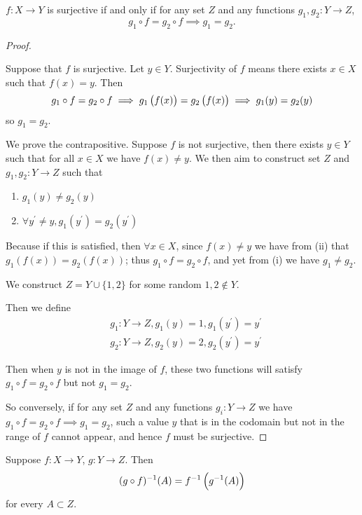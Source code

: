 \begin{proposition}
$f:X\to Y$ is surjective if and only if for any set $Z$ and any functions $g_1,g_2:Y\to Z$,
\[g_1 \circ f=g_2 \circ f \implies g_1=g_2.\]
\end{proposition}

\begin{proof} \

\fbox{$\implies$} Suppose that $f$ is surjective. Let $y\in Y$. Surjectivity of $f$ means there exists $x\in X$ such that $f(x)=y$. Then
\[g_1\circ f=g_2 \circ f\implies g_1\left(f(x)\right)=g_2\left(f(x)\right)\implies g_1(y)=g_2(y) \]
so $g_1=g_2$.

\fbox{$\impliedby$} We prove the contrapositive. Suppose $f$ is not surjective, then there exists $y \in Y$ such that for all $x \in X$ we have $f(x)\neq y$. We then aim to construct set $Z$ and $g_1,g_2:Y\to Z$ such that
\begin{enumerate}[label=(\roman*)]
\item $g_1(y) \neq g_2(y)$
\item $\forall y^\prime \neq y, g_1(y^\prime)=g_2(y^\prime)$
\end{enumerate}

Because if this is satisfied, then $\forall x \in X$, since $f(x)\neq y$ we have from (ii) that $g_1(f(x))=g_2(f(x))$; thus $g_1 \circ f=g_2 \circ f$, and yet from (i) we have $g_1 \neq g_2$.

We construct $Z=Y\cup\{1,2\}$ for some random $1,2 \notin Y$.

Then we define
\begin{align*}
&g_1:Y\to Z,g_1(y)=1,g_1(y^\prime)=y^\prime\\
&g_2:Y\to Z,g_2(y)=2,g_2(y^\prime)=y^\prime
\end{align*}

Then when $y$ is not in the image of $f$, these two functions will satisfy $g_1 \circ f=g_2 \circ f$ but not $g_1=g_2$.

So conversely, if for any set $Z$ and any functions $g_i:Y \to Z$ we have $g_1 \circ f=g_2 \circ f \implies g_1=g_2$, such a value $y$ that is in the codomain but not in the range of $f$ cannot appear, and hence $f$ must be surjective.
\end{proof}

\begin{lemma}
Suppose $f:X\to Y$, $g:Y\to Z$. Then
\[(g\circ f)^{-1}(A)=f^{-1}\left(g^{-1}(A)\right)\]
for every $A\subset Z$.
\end{lemma}

